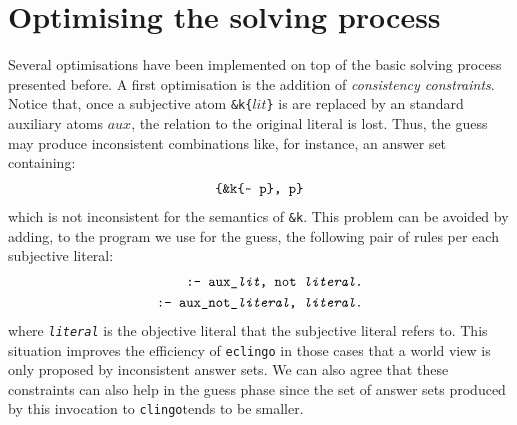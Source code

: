 \documentclass{new_tlp}
\newcommand{\textapprox}{\raisebox{0.5ex}{\texttildelow}}
\def\eclingo{{\tt eclingo}}
\def\clingo{{\tt clingo}}
\begin{document}
\section{Optimising the solving process}
\label{sec:optim}
Several optimisations have been implemented on top of the basic solving process presented before.
%
A first optimisation is the addition of \emph{consistency constraints}.
%
Notice that, once a subjective atom {\tt \&k\{$lit$\}} is are replaced by an standard auxiliary atoms $aux$, the relation to the original literal is lost.
%
Thus, the guess may produce inconsistent combinations like, for instance, an answer set containing:
\begin{align*}
	\texttt{\{\&k\{\textapprox\ p\}, p\}}
\end{align*}
which is not inconsistent for the semantics of {\tt \&k}.
This problem can be avoided by adding, to the program we use for the guess, the following pair of rules per each subjective literal:
\begin{align}
\texttt{:- aux\_\emph{lit}, not \emph{literal}.} \label{r:1} \\
\texttt{:- aux\_not\_\emph{literal}, \emph{literal}.} \label{r:2}
\end{align}
where \texttt{\emph{literal}} is the objective literal that the subjective literal refers to.
%
This situation improves the efficiency of \eclingo{} in those cases that a world view is only proposed by inconsistent answer sets. We can also agree that these constraints can also help in the guess phase since the set of answer sets produced by this invocation to \clingo tends to be smaller.
\end{document}
